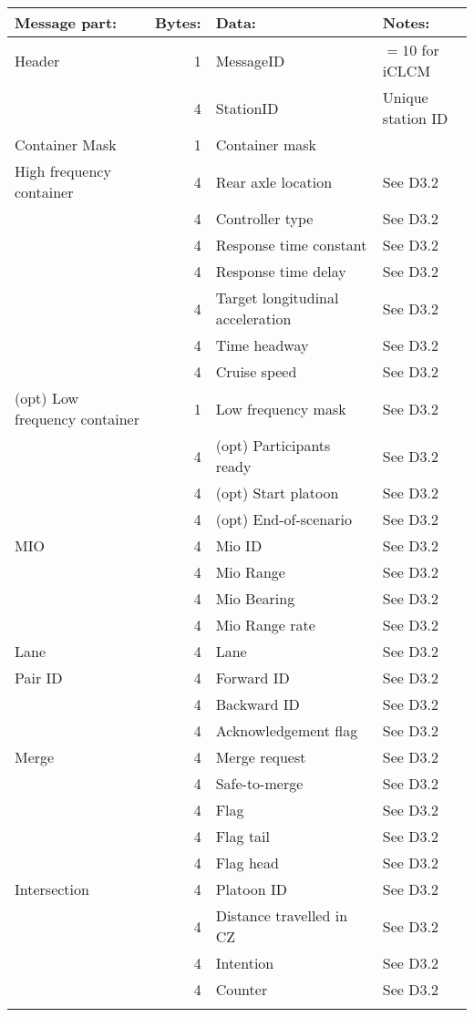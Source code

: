 \documentclass[11pt]{article}
\begin{document}
\begin{center}
\begin{tabular}{lrll}
Message part: & Bytes: & Data: & Notes:\\
\hline
Header & 1 & MessageID & \(=10\) for iCLCM\\
 & 4 & StationID & Unique station ID\\
\hline
Container Mask & 1 & Container mask & \\
\hline
High frequency container & 4 & Rear axle location & See D3.2\\
 & 4 & Controller type & See D3.2\\
 & 4 & Response time constant & See D3.2\\
 & 4 & Response time delay & See D3.2\\
 & 4 & Target longitudinal acceleration & See D3.2\\
 & 4 & Time headway & See D3.2\\
 & 4 & Cruise speed & See D3.2\\
\hline
(opt) Low frequency container & 1 & Low frequency mask & See D3.2\\
 & 4 & (opt) Participants ready & See D3.2\\
 & 4 & (opt) Start platoon & See D3.2\\
 & 4 & (opt) End-of-scenario & See D3.2\\
\hline
MIO & 4 & Mio ID & See D3.2\\
 & 4 & Mio Range & See D3.2\\
 & 4 & Mio Bearing & See D3.2\\
 & 4 & Mio Range rate & See D3.2\\
\hline
Lane & 4 & Lane & See D3.2\\
\hline
Pair ID & 4 & Forward ID & See D3.2\\
 & 4 & Backward ID & See D3.2\\
 & 4 & Acknowledgement flag & See D3.2\\
\hline
Merge & 4 & Merge request & See D3.2\\
 & 4 & Safe-to-merge & See D3.2\\
 & 4 & Flag & See D3.2\\
 & 4 & Flag tail & See D3.2\\
 & 4 & Flag head & See D3.2\\
\hline
Intersection & 4 & Platoon ID & See D3.2\\
 & 4 & Distance travelled in CZ & See D3.2\\
 & 4 & Intention & See D3.2\\
 & 4 & Counter & See D3.2\\
 &  &  & \\
\end{tabular}
\end{center}
\end{document}
